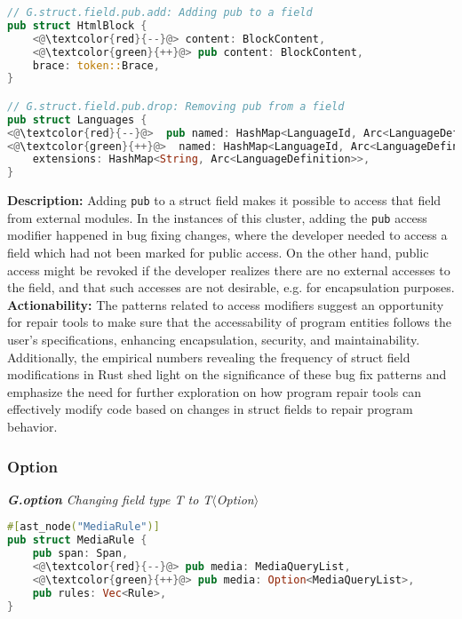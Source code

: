 \begin{lstlisting}[language=Rust, style=colouredRust]
// G.struct.field.pub.add: Adding pub to a field
pub struct HtmlBlock {
    <@\textcolor{red}{--}@> content: BlockContent,
    <@\textcolor{green}{++}@> pub content: BlockContent,
    brace: token::Brace,
} 

// G.struct.field.pub.drop: Removing pub from a field
pub struct Languages {
<@\textcolor{red}{--}@>  pub named: HashMap<LanguageId, Arc<LanguageDefinition>>,
<@\textcolor{green}{++}@>  named: HashMap<LanguageId, Arc<LanguageDefinition>>,
    extensions: HashMap<String, Arc<LanguageDefinition>>,
}

\end{lstlisting}

\noindent\textbf{Description:} Adding \texttt{pub} to a struct field makes it possible to access that field from external modules. In the instances of this cluster, adding the \texttt{pub} access modifier happened in bug fixing changes, where the developer needed to access a field which had not been marked for public access. On the other hand, public access might be revoked if the developer realizes there are no external accesses to the field, and that such accesses are not desirable, e.g. for encapsulation purposes. \\

\noindent\textbf{Actionability:} The patterns related to access modifiers suggest an opportunity for repair tools to make sure that the accessability of program entities follows the user's specifications, enhancing encapsulation, security, and maintainability. Additionally, the empirical numbers revealing the frequency of struct field modifications in Rust shed light on the significance of these bug fix patterns and emphasize the need for further exploration on how program repair tools can effectively modify code based on changes in struct fields to repair program behavior. 

\subsubsection{Option}
\vspace{3mm}

\noindent\textit{\textbf{G.option} Changing field type T to T$\langle$Option$\rangle$}

\begin{lstlisting}[language=Rust, style=colouredRust]
#[ast_node("MediaRule")]
pub struct MediaRule {
    pub span: Span,
    <@\textcolor{red}{--}@> pub media: MediaQueryList,
    <@\textcolor{green}{++}@> pub media: Option<MediaQueryList>,
    pub rules: Vec<Rule>,
}

\end{lstlisting}

